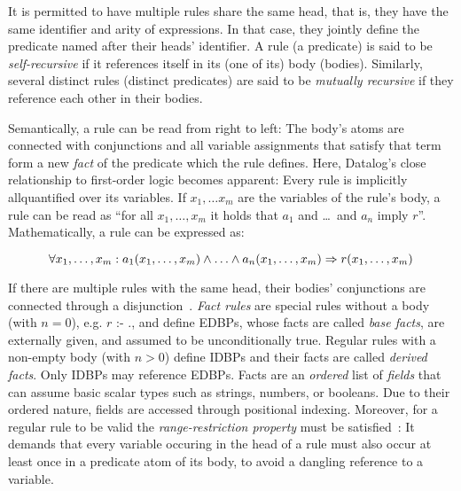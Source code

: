 It is permitted to have multiple rules share the same head, that is,
they have the same identifier and arity of expressions.
In that case, they jointly define the predicate named after their heads' identifier.
A rule (a predicate) is said to be \emph{self-recursive}
if it references itself in its (one of its) body (bodies).
Similarly, several distinct rules (distinct predicates) are said to be
\emph{mutually recursive} if they reference each other in their bodies.

Semantically, a rule can be read from right to left: The body's atoms are
connected with conjunctions and all variable assignments that satisfy that term
form a new \emph{fact} of the predicate which the rule defines.
Here, Datalog's close relationship to first-order logic becomes apparent:
Every rule is implicitly allquantified over its variables.
If \(x_1, \ldots x_m\) are the variables of the rule's body, a rule can be read as
``for all \(x_1, \ldots, x_m\) it holds that \(a_1\) and \ldots\ and \(a_n\) imply \(r\)''.
Mathematically, a rule can be expressed as\footnotemark{}:


\begin{equation}
	\forall x_1, \ldots, x_m: a_1(x_1, \ldots, x_m) \land \ldots \land a_n(x_1, \ldots, x_m) \Rightarrow r(x_1, \ldots, x_m) \\
\end{equation}

If there are multiple rules with the same head, their bodies' conjunctions
are connected through a disjunction~\cite{abo2024convergence}.
\emph{Fact rules} are special rules without a body (with $n=0$), e.g.
\( r \text{ :- } .\), and define \acp{EDBP}, whose facts are called
\emph{base facts}, are externally given, and assumed to be unconditionally true.
Regular rules with a non-empty body (with $n>0$) define \acp{IDBP}
and their facts are called \emph{derived facts}.
Only \acp{IDBP} may reference \acp{EDBP}.
Facts are an \emph{ordered} list of \emph{fields} that can assume basic scalar
types such as strings, numbers, or booleans.
Due to their ordered nature, fields are accessed through positional indexing.
Moreover, for a regular rule to be valid the \emph{range-restriction property}
must be satisfied~\cite{green2013datalog}:
It demands that every variable occuring in the head of a rule must also occur
at least once in a predicate atom of its body, to avoid a dangling reference
to a variable.

